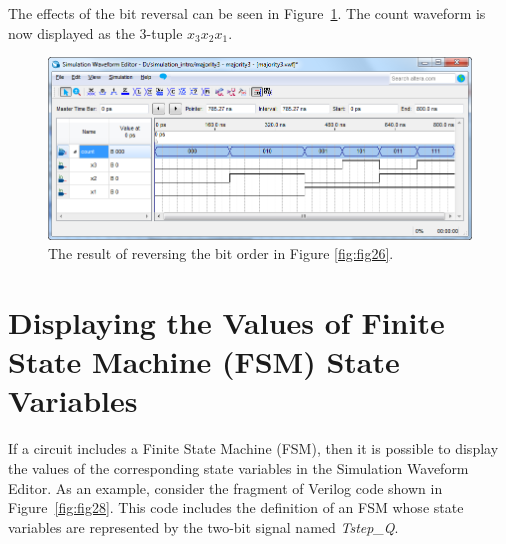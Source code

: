 \documentclass[11pt, twoside, pdftex]{article}
\begin{document}
The effects of the bit reversal can be seen in Figure~\ref{fig:fig27}. The count waveform is now 
displayed as the 3-tuple $x_3 x_2 x_1$.
\begin{figure}[H]
   \begin{center}
      \includegraphics[scale=0.65]{figures/appendix/figure27.png}
   \caption{The result of reversing the bit order in Figure \ref{fig:fig26}.} 
	 \label{fig:fig27}
	 \end{center}
\end{figure} 	

\iffalse

\section{Displaying the Values of Finite State Machine (FSM) State Variables}
If a circuit includes a Finite State Machine (FSM), then it is possible to display the 
values of the corresponding state variables in the Simulation Waveform Editor. 
As an example, consider the fragment of Verilog code shown in Figure~\ref{fig:fig28}.
This code includes the definition of an FSM whose state variables are represented by the 
two-bit signal named {\it Tstep\_Q}. 
\end{document}
